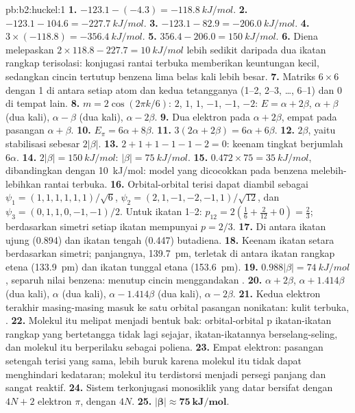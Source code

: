 \begin{solution}{pb:b2:huckel:1}
\textbf{1.} $-123.1 - (-4.3) = \qty{-118.8}{kJ/mol}$.
\textbf{2.} $-123.1 - 104.6 = \qty{-227.7}{kJ/mol}$.
\textbf{3.} $-123.1 - 82.9 = \qty{-206.0}{kJ/mol}$.
\textbf{4.} $3 \times (-118.8) = \qty{-356.4}{kJ/mol}$.
\textbf{5.} $356.4 - 206.0 = \qty{150}{kJ/mol}$.
\textbf{6.} Diena melepaskan $2 \times 118.8 - 227.7 = \qty{10}{kJ/mol}$ lebih
sedikit daripada dua ikatan rangkap terisolasi: konjugasi rantai terbuka
memberikan keuntungan kecil, sedangkan cincin tertutup benzena lima belas
kali lebih besar.
\textbf{7.} Matriks $6 \times 6$ dengan 1 di antara setiap atom dan kedua
tetangganya (1--2, 2--3, \dots, 6--1) dan 0 di tempat lain.
\textbf{8.} $m = 2\cos(2\pi k/6)$: $2$, $1$, $1$, $-1$, $-1$, $-2$: $E = \alpha + 2\beta$,
$\alpha + \beta$ (dua kali), $\alpha - \beta$ (dua kali), $\alpha - 2\beta$.
\textbf{9.} Dua elektron pada $\alpha + 2\beta$, empat pada pasangan
$\alpha + \beta$.
\textbf{10.} $E_\pi = 6\alpha + 8\beta$.
\textbf{11.} $3(2\alpha + 2\beta) = 6\alpha + 6\beta$.
\textbf{12.} $2\beta$, yaitu stabilisasi sebesar $2|\beta|$.
\textbf{13.} $2 + 1 + 1 - 1 - 1 - 2 = 0$: keenam tingkat berjumlah $6\alpha$.
\textbf{14.} $2|\beta| = \qty{150}{kJ/mol}$: $|\beta| = \qty{75}{kJ/mol}$.
\textbf{15.} $0.472 \times 75 = \qty{35}{kJ/mol}$, dibandingkan dengan
\qty{10}{kJ/mol}: model yang dicocokkan pada benzena melebih-lebihkan rantai
terbuka.
\textbf{16.} Orbital-orbital terisi dapat diambil sebagai
$\psi_1 = (1, 1, 1, 1, 1, 1)/\sqrt6$,
$\psi_2 = (2, 1, -1, -2, -1, 1)/\sqrt{12}$, dan $\psi_3 = (0, 1, 1, 0, -1, -1)/2$.
Untuk ikatan 1--2: $p_{12} = 2(\frac16 + \frac{2}{12} + 0) = \frac23$;
berdasarkan simetri setiap ikatan mempunyai $p = 2/3$.
\textbf{17.} Di antara ikatan ujung (0.894) dan ikatan tengah (0.447)
butadiena.
\textbf{18.} Keenam ikatan setara berdasarkan simetri; panjangnya,
\qty{139.7}{pm}, terletak di antara ikatan rangkap etena (\qty{133.9}{pm})
dan ikatan tunggal etana (\qty{153.6}{pm}).
\textbf{19.} $0.988|\beta| = \qty{74}{kJ/mol}$, separuh nilai benzena:
menutup cincin menggandakan .
\textbf{20.} $\alpha + 2\beta$, $\alpha + 1.414\beta$ (dua kali), $\alpha$ (dua kali),
$\alpha - 1.414\beta$ (dua kali), $\alpha - 2\beta$.
\textbf{21.} Kedua elektron terakhir masing-masing masuk ke satu orbital
pasangan nonikatan: kulit terbuka, .
\textbf{22.} Molekul itu melipat menjadi bentuk bak: orbital-orbital p
ikatan-ikatan rangkap yang bertetangga tidak lagi sejajar, ikatan-ikatannya
berselang-seling, dan molekul itu berperilaku sebagai poliena.
\textbf{23.} Empat elektron: pasangan setengah terisi yang sama, lebih buruk
karena molekul itu tidak dapat menghindari kedataran; molekul itu
terdistorsi menjadi persegi panjang dan sangat reaktif.
\textbf{24.} Sistem terkonjugasi monosiklik yang datar bersifat 
dengan $4N + 2$ elektron $\pi$,  dengan $4N$.
\textbf{25.} $\boldsymbol{|\beta| \approx \qty{75}{kJ/mol}}$.
\end{solution}
